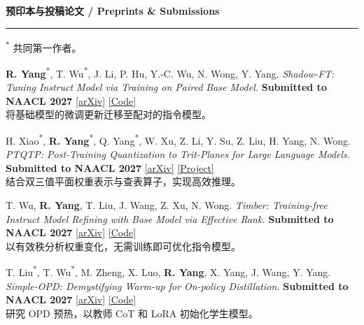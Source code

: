 \documentclass[UTF8,fontset=fandol,11pt,a4paper]{ctexart}
\newcommand{\submissionbadge}[1]{\begingroup\setlength{\fboxsep}{1.5pt}\colorbox{submissionfill}{\textcolor{venuetext}{\bfseries #1}}\endgroup}
\newenvironment{rSection}[1]{
  \Needspace{7\baselineskip}\medskip
  \textbf{#1}\smallskip\hrule\smallskip
}{\par}
\begin{document}
\begin{rSection}{预印本与投稿论文 / Preprints \& Submissions}\linespread{1.05}\fontsize{10}{12}\selectfont\raggedright
\textsuperscript{*} 共同第一作者。
\begin{enumerate}[label={[P\arabic*]}]
\item\begin{samepage} \textbf{R. Yang}\textsuperscript{*}, T. Wu\textsuperscript{*}, J. Li, P. Hu, Y.-C. Wu, N. Wong, Y. Yang. \textit{Shadow-FT: Tuning Instruct Model via Training on Paired Base Model.} \submissionbadge{Submitted to NAACL 2027} \href{https://arxiv.org/abs/2505.12716}{[arXiv]} \href{https://github.com/wutaiqiang/Shadow-FT}{[Code]}\\[1pt]{\textcolor{summarytext}{将基础模型的微调更新迁移至配对的指令模型。}}\par\end{samepage}
\item\begin{samepage} H. Xiao\textsuperscript{*}, \textbf{R. Yang}\textsuperscript{*}, Q. Yang\textsuperscript{*}, W. Xu, Z. Li, Y. Su, Z. Liu, H. Yang, N. Wong. \textit{PTQTP: Post-Training Quantization to Trit-Planes for Large Language Models.} \submissionbadge{Submitted to NAACL 2027} \href{https://arxiv.org/abs/2509.16989}{[arXiv]} \href{https://github.com/HeXiao-55/PTQTP}{[Project]}\\[1pt]{\textcolor{summarytext}{结合双三值平面权重表示与查表算子，实现高效推理。}}\par\end{samepage}
\item\begin{samepage} T. Wu, \textbf{R. Yang}, T. Liu, J. Wang, Z. Xu, N. Wong. \textit{Timber: Training-free Instruct Model Refining with Base Model via Effective Rank.} \submissionbadge{Submitted to NAACL 2027} \href{https://arxiv.org/abs/2509.23595}{[arXiv]} \href{https://github.com/wutaiqiang/Timber}{[Code]}\\[1pt]{\textcolor{summarytext}{以有效秩分析权重变化，无需训练即可优化指令模型。}}\par\end{samepage}
\item\begin{samepage} T. Liu\textsuperscript{*}, T. Wu\textsuperscript{*}, M. Zheng, X. Luo, \textbf{R. Yang}, X. Yang, J. Wang, Y. Yang. \textit{Simple-OPD: Demystifying Warm-up for On-policy Distillation.} \submissionbadge{Submitted to NAACL 2027} \href{https://arxiv.org/abs/2608.06802}{[arXiv]} \href{https://github.com/Utaotao/Simple-OPD}{[Code]}\\[1pt]{\textcolor{summarytext}{研究 OPD 预热，以教师 CoT 和 LoRA 初始化学生模型。}}\par\end{samepage}

\end{enumerate}
\end{rSection}
\end{document}
